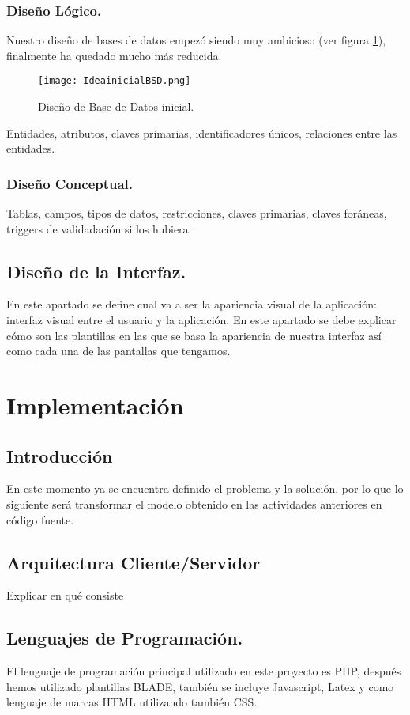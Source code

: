 \documentclass{article}
\begin{document}
\subsubsection{Diseño Lógico.}
 Nuestro diseño de bases de datos empezó siendo muy ambicioso (ver figura \ref{fig:bsdini}), finalmente ha quedado mucho más reducida.

\begin{figure}[h]
\centering
\texttt{[image: IdeainicialBSD.png]}
\caption{\label{fig:bsdini} Diseño de Base de Datos inicial.}
\end{figure}
Entidades, atributos, claves primarias, identificadores únicos, relaciones entre las entidades.
\subsubsection{Diseño Conceptual.}
Tablas, campos, tipos de datos, restricciones, claves primarias, claves foráneas, triggers de validadación si los hubiera.
\subsection{Diseño de la Interfaz.}
En este apartado se define cual va a ser la apariencia visual de la aplicación:  interfaz visual entre el usuario y la aplicación.
En este apartado se debe explicar cómo son las plantillas en las que se basa la apariencia de nuestra interfaz así como cada una de las pantallas que tengamos.

\section{Implementación}
\subsection{Introducción}
En este momento ya se encuentra definido el problema y la solución, por lo que lo siguiente será transformar el modelo obtenido en las actividades anteriores en código fuente.
\subsection{Arquitectura Cliente/Servidor}
Explicar en qué consiste
\subsection{Lenguajes de Programación.}
El lenguaje de programación principal utilizado en este proyecto es PHP, después hemos utilizado plantillas BLADE, también se incluye Javascript, Latex y como lenguaje de marcas HTML utilizando también CSS.
\end{document}
